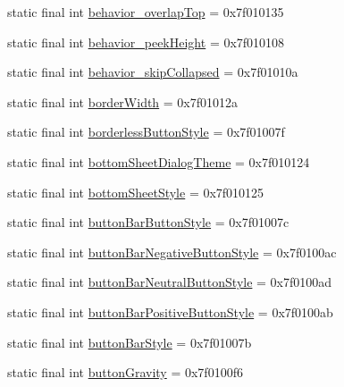 \begin{CompactItemize}
\item 
static final int \hyperlink{classandroid_1_1support_1_1transition_1_1_r_1_1attr_757c89573bac2faad9209b2ecf04a6f3}{behavior\_\-overlapTop} = 0x7f010135
\item 
static final int \hyperlink{classandroid_1_1support_1_1transition_1_1_r_1_1attr_67b9c8c5bb1e4b83130ca3a7dada304e}{behavior\_\-peekHeight} = 0x7f010108
\item 
static final int \hyperlink{classandroid_1_1support_1_1transition_1_1_r_1_1attr_595748d655f8745acf0cfc8756af3b89}{behavior\_\-skipCollapsed} = 0x7f01010a
\item 
static final int \hyperlink{classandroid_1_1support_1_1transition_1_1_r_1_1attr_297ef325188026de468694931a2f9590}{borderWidth} = 0x7f01012a
\item 
static final int \hyperlink{classandroid_1_1support_1_1transition_1_1_r_1_1attr_9f6db60432f7cfa2b8a38a5c2dfb9444}{borderlessButtonStyle} = 0x7f01007f
\item 
static final int \hyperlink{classandroid_1_1support_1_1transition_1_1_r_1_1attr_e2cc70aa4ce7d52b1d818cac6fd10edb}{bottomSheetDialogTheme} = 0x7f010124
\item 
static final int \hyperlink{classandroid_1_1support_1_1transition_1_1_r_1_1attr_4eb1fe56cb93d2ffb37f55698d849e76}{bottomSheetStyle} = 0x7f010125
\item 
static final int \hyperlink{classandroid_1_1support_1_1transition_1_1_r_1_1attr_8fe3228dfd4dfeb406a2a612ce3b480a}{buttonBarButtonStyle} = 0x7f01007c
\item 
static final int \hyperlink{classandroid_1_1support_1_1transition_1_1_r_1_1attr_92ca34cc3aa0cd21a60ec760e2835f1b}{buttonBarNegativeButtonStyle} = 0x7f0100ac
\item 
static final int \hyperlink{classandroid_1_1support_1_1transition_1_1_r_1_1attr_57cb7b8da17ad820c4ef48c99f1e9a61}{buttonBarNeutralButtonStyle} = 0x7f0100ad
\item 
static final int \hyperlink{classandroid_1_1support_1_1transition_1_1_r_1_1attr_7118de798c1808eb2ec30350c52c2cd8}{buttonBarPositiveButtonStyle} = 0x7f0100ab
\item 
static final int \hyperlink{classandroid_1_1support_1_1transition_1_1_r_1_1attr_1757bbd30e765bf71c8529be67ca0fe1}{buttonBarStyle} = 0x7f01007b
\item 
static final int \hyperlink{classandroid_1_1support_1_1transition_1_1_r_1_1attr_47f711430770c37ed6fe0809f4486c20}{buttonGravity} = 0x7f0100f6
\item 

\end{CompactItemize}
